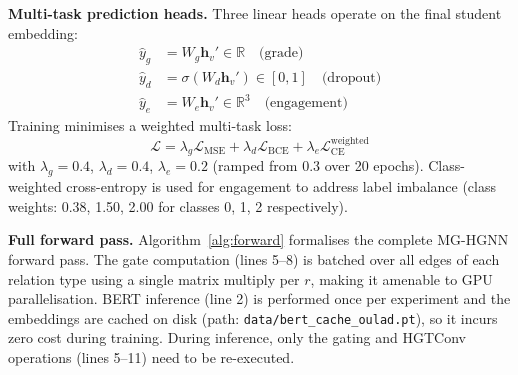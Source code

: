 \documentclass[sigconf]{acmart}
\begin{document}
\textbf{Multi-task prediction heads.}
Three linear heads operate on the final student
embedding:
\begin{align}
  \hat{y}_g &= W_g \mathbf{h}_v'
    \in \mathbb{R} \quad \text{(grade)} \\
  \hat{y}_d &= \sigma(W_d \mathbf{h}_v')
    \in [0,1] \quad \text{(dropout)} \\
  \hat{y}_e &= W_e \mathbf{h}_v'
    \in \mathbb{R}^3 \quad \text{(engagement)}
\end{align}
Training minimises a weighted multi-task loss:
\begin{equation}
  \mathcal{L} = \lambda_g \mathcal{L}_{\text{MSE}}
  + \lambda_d \mathcal{L}_{\text{BCE}}
  + \lambda_e \mathcal{L}_{\text{CE}}^{\text{weighted}}
  \label{eq:loss}
\end{equation}
with $\lambda_g = 0.4$, $\lambda_d = 0.4$,
$\lambda_e = 0.2$ (ramped from 0.3 over 20 epochs).
Class-weighted cross-entropy is used for engagement
to address label imbalance (class weights: 0.38,
1.50, 2.00 for classes 0, 1, 2 respectively).

\textbf{Full forward pass.}
Algorithm~\ref{alg:forward} formalises the complete
MG-HGNN forward pass. The gate computation
(lines 5--8) is batched over all edges of each
relation type using a single matrix multiply per
$r$, making it amenable to GPU parallelisation.
BERT inference (line 2) is performed once per
experiment and the embeddings are cached on disk
(path: \texttt{data/bert\_cache\_oulad.pt}),
so it incurs zero cost during training. During
inference, only the gating and HGTConv operations
(lines 5--11) need to be re-executed.
\end{document}
